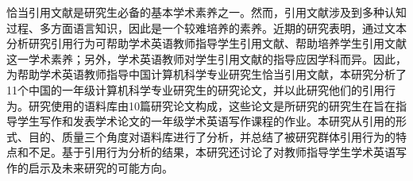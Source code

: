 
\begin{cabstract}
  恰当引用文献是研究生必备的基本学术素养之一。然而，引用文献涉及到多种认知过程、多方面语言知识，因此是一个较难培养的素养。近期的研究表明，通过文本分析研究引用行为可帮助学术英语教师指导学生引用文献、帮助培养学生引用文献这一学术素养；另外，学术英语教师对学生引用文献的指导应因学科而异。因此，为帮助学术英语教师指导中国计算机科学专业研究生恰当引用文献，本研究分析了11个中国的一年级计算机科学专业研究生的研究论文，并以此研究他们的引用行为。研究使用的语料库由10篇研究论文构成，这些论文是所研究的研究生在旨在指导学生写作和发表学术论文的一年级学术英语写作课程的作业。本研究从引用的形式、目的、质量三个角度对语料库进行了分析，并总结了被研究群体引用行为的特点和不足。基于引用行为分析的结果，本研究还讨论了对教师指导学生学术英语写作的启示及未来研究的可能方向。
\end{cabstract}


